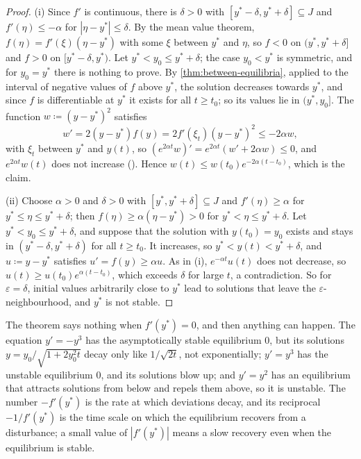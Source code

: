 \begin{proof}
(i) Since $f'$ is continuous, there is $\delta>0$ with $[y^*-\delta,y^*+\delta]\subseteq J$ and $f'(\eta)\le-\alpha$ for $|\eta-y^*|\le\delta$. By the mean value theorem, $f(\eta)=f'(\xi)(\eta-y^*)$ with some $\xi$ between $y^*$ and $\eta$, so $f<0$ on $(y^*,y^*+\delta]$ and $f>0$ on $[y^*-\delta,y^*)$. Let $y^*<y_0\le y^*+\delta$; the case $y_0<y^*$ is symmetric, and for $y_0=y^*$ there is nothing to prove. By \cref{thm:between-equilibria}, applied to the interval of negative values of $f$ above $y^*$, the solution decreases towards $y^*$, and since $f$ is differentiable at $y^*$ it exists for all $t\ge t_0$; so its values lie in $(y^*,y_0]$. The function $w\coloneqq(y-y^*)^2$ satisfies
\[
w'=2(y-y^*)f(y)=2f'(\xi_t)(y-y^*)^2\le-2\alpha w ,
\]
with $\xi_t$ between $y^*$ and $y(t)$, so $(e^{2\alpha t}w)'=e^{2\alpha t}(w'+2\alpha w)\le0$, and $e^{2\alpha t}w(t)$ does not increase (). Hence $w(t)\le w(t_0)e^{-2\alpha(t-t_0)}$, which is the claim.

(ii) Choose $\alpha>0$ and $\delta>0$ with $[y^*,y^*+\delta]\subseteq J$ and $f'(\eta)\ge\alpha$ for $y^*\le\eta\le y^*+\delta$; then $f(\eta)\ge\alpha(\eta-y^*)>0$ for $y^*<\eta\le y^*+\delta$. Let $y^*<y_0\le y^*+\delta$, and suppose that the solution with $y(t_0)=y_0$ exists and stays in $(y^*-\delta,y^*+\delta)$ for all $t\ge t_0$. It increases, so $y^*<y(t)<y^*+\delta$, and $u\coloneqq y-y^*$ satisfies $u'=f(y)\ge\alpha u$. As in (i), $e^{-\alpha t}u(t)$ does not decrease, so $u(t)\ge u(t_0)e^{\alpha(t-t_0)}$, which exceeds $\delta$ for large $t$, a contradiction. So for $\varepsilon=\delta$, initial values arbitrarily close to $y^*$ lead to solutions that leave the $\varepsilon$-neighbourhood, and $y^*$ is not stable.
\end{proof}

The theorem says nothing when $f'(y^*)=0$, and then anything can happen. The equation $y'=-y^3$ has the asymptotically stable equilibrium $0$, but its solutions $y=y_0/\sqrt{1+2y_0^2t}$ decay only like $1/\sqrt{2t}$, not exponentially; $y'=y^3$ has the unstable equilibrium $0$, and its solutions blow up; and $y'=y^2$ has an equilibrium that attracts solutions from below and repels them above, so it is unstable. The number $-f'(y^*)$ is the rate at which deviations decay, and its reciprocal $-1/f'(y^*)$ is the time scale on which the equilibrium recovers from a disturbance; a small value of $|f'(y^*)|$ means a slow recovery even when the equilibrium is stable.


